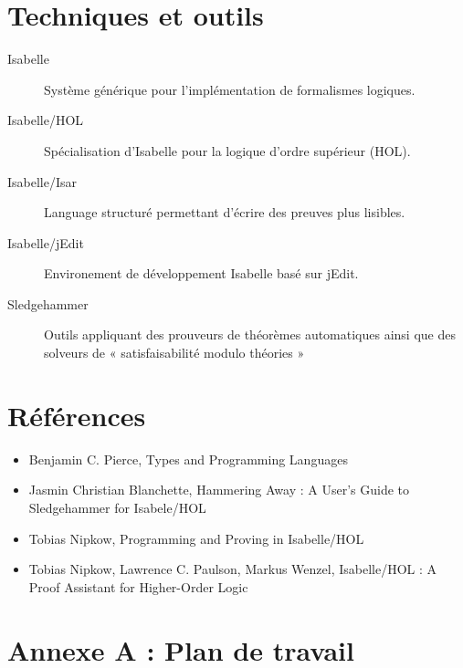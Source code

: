 \documentclass[a4paper, oneside, 12pt, titlepage, draft]{article}
\begin{document}
\section{Techniques et outils}

\begin{description}
  \item[Isabelle] Système générique pour l'implémentation de formalismes logiques.
  \item[Isabelle/HOL] Spécialisation d'Isabelle pour la logique d'ordre supérieur (\gls{HOL}).
  \item[Isabelle/Isar] Language structuré permettant d'écrire des preuves plus lisibles.
  \item[Isabelle/jEdit] Environement de développement Isabelle basé sur jEdit.
  \item[Sledgehammer] Outils appliquant des prouveurs de théorèmes automatiques ainsi que des
    solveurs de « satisfaisabilité modulo théories »
\end{description}

\section{Références}


\begin{itemize}
  \item Benjamin C. Pierce, Types and Programming Languages
  \item Jasmin Christian Blanchette, Hammering Away : A User's Guide to Sledgehammer for Isabele/HOL
  \item Tobias Nipkow, Programming and Proving in Isabelle/HOL
  \item Tobias Nipkow, Lawrence C. Paulson, Markus Wenzel, Isabelle/HOL : A Proof Assistant for
    Higher-Order Logic
\end{itemize}

\section{Annexe A : Plan de travail}

%
\end{document}
